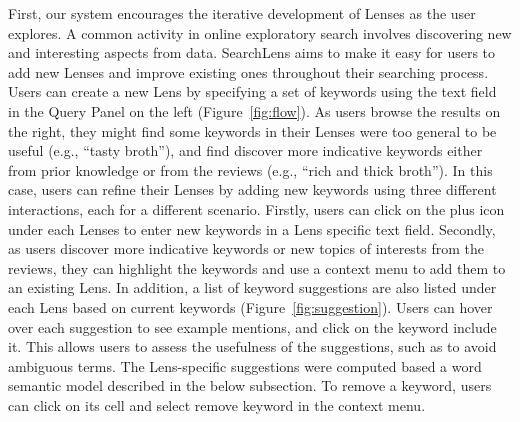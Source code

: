 \documentclass{sigchi}
\begin{document}
First, our system encourages the iterative development of Lenses as the user explores. A common activity in online exploratory search involves discovering new and interesting aspects from data. SearchLens aims to make it easy for users to add new Lenses and improve existing ones throughout their searching process. Users can create a new Lens by specifying a set of keywords using the text field in the Query Panel on the left (Figure~\ref{fig:flow}). As users browse the results on the right, they might find some keywords in their Lenses were too general to be useful (e.g., ``tasty broth''), and find discover more indicative keywords either from prior knowledge or from the reviews (e.g., ``rich and thick broth''). In this case, users can refine their Lenses by adding new keywords using three different interactions, each for a different scenario. Firstly, users can click on the plus icon under each Lenses to enter new keywords in a Lens specific text field. Secondly, as users discover more indicative keywords or new topics of interests from the reviews, they can highlight the keywords and use a context menu to add them to an existing Lens. In addition, a list of keyword suggestions are also listed under each Lens based on current keywords (Figure~\ref{fig:suggestion}). Users can hover over each suggestion to see example mentions, and click on the keyword include it. This allows users to assess the usefulness of the suggestions, such as to avoid ambiguous terms. The Lens-specific suggestions were computed based a word semantic model described in the below subsection. To remove a keyword, users can click on its cell and select remove keyword in the context menu.


\end{document}
